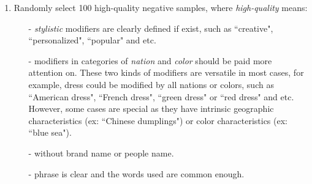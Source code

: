 \begin{enumerate}
	\item Randomly select 100 high-quality negative samples, where \textit{high-quality} means:
	\begin{itemize}
		\item [-] \textit{stylistic} modifiers are clearly defined if exist, such as ``creative", ``personalized", ``popular" and etc.
		\item [-] modifiers in categories of \textit{nation} and \textit{color} should be paid more attention on. These two kinds of modifiers are versatile in most cases, for example, dress could be modified by all nations or colors, such as ``American dress", ``French dress", ``green dress" or ``red dress" and etc. However, some cases are special as they have intrinsic geographic characteristics (ex: ``Chinese dumplings") or color characteristics (ex: ``blue sea").
		\item [-] without brand name or people name. %
		\item [-] phrase is clear and the words used are common enough.	
	\end{itemize}

\end{enumerate}
